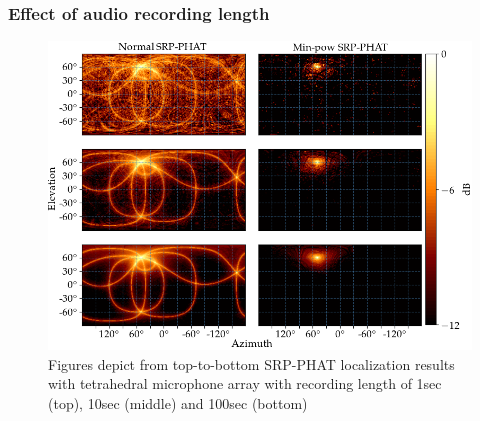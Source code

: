 \subsubsection{Effect of audio recording length}
\begin{figure}[H]
    \centering
    \includegraphics[width=\textwidth]{Figures/audioLenSim.png}
    \caption{Figures depict from top-to-bottom SRP-PHAT localization results with tetrahedral microphone array with recording length of 1sec  (top), 10sec (middle) and 100sec (bottom)}
    \label{fig:micErrTilt}
\end{figure}
\
